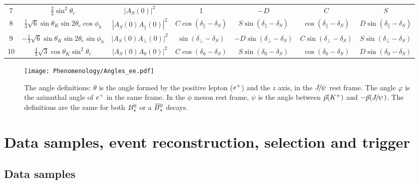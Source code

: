 \begin{sidewaystable}[h]
\begin{center}
\begin{tabular}{c|c|c|c|c|c|c}
    7   & $\frac{2}{3}\sin^{2}\theta_{e}$ & $|A_{S}(0)|^{2}$ &  1 & $-D$ & $C$ & $S$\\
    8   & $\frac{1}{3}\sqrt{6}\sin\theta_{K}\sin2\theta_{e}\cos\phi_{h}$ & $|A_{S}(0)A_{\parallel}(0)|^{2}$ & $C\cos(\delta_{\parallel}-\delta_{S})$  & $S\sin(\delta_{\parallel}-\delta_{S})$ & $\cos(\delta_{\parallel}-\delta_{S})$ & $D\sin(\delta_{\parallel}-\delta_{S})$\\
    9   & $-\frac{1}{3}\sqrt{6}\sin\theta_{K}\sin2\theta_{e}\sin\phi_{h}$ & $|A_{S}(0)A_{\perp}(0)|^{2}$ & $\sin(\delta_{\perp}-\delta_{S})$  & $-D\sin(\delta_{\perp}-\delta_{S})$ & $C\sin(\delta_{\perp}-\delta_{S})$ & $S\sin(\delta_{\perp}-\delta_{S})$\\
    10   & $\frac{4}{3}\sqrt{3}\cos\theta_{K}\sin^{2}\theta_{e}$ & $|A_{S}(0)A_{0}(0)|^{2}$ & $C\cos(\delta_{0}-\delta_{S})$  & $S\sin(\delta_{0}-\delta_{S})$ & $\cos(\delta_{0}-\delta_{S})$ & $D\sin(\delta_{0}-\delta_{S})$\\
    \hline
  \end{tabular}\end{center}
\label{tab:AngTimeFunction}
\end{sidewaystable}

   \begin{figure}[hbt]
  \begin{center}
    \texttt{[image: Phenomenology/Angles\_ee.pdf]}
  \end{center}
  \caption{
   The angle definitions: $\theta$ is the angle formed by the positive lepton (${e^+}$) and the $z$ axis, in the ${{J\mskip -3mu/\mskip -2mu\psi\mskip 2mu}}$ rest frame. The angle $\varphi$ is the azimuthal angle of ${e^+}$ in the same frame. In the $\phi$ meson rest frame, $\psi$ is the angle between $\vec{p}({{K}^+})$ and $-\vec{p}({{J\mskip -3mu/\mskip -2mu\psi\mskip 2mu}})$. The definitions are the same for both ${{B}^0_{s}}$ or a ${{\kern 0.18em\overline{\kern -0.18em B}{}}{}^0_{s}}$ decays.   
}
  \label{fig:Phen:Angles}
\end{figure}
\clearpage


\section{Data samples, event reconstruction, selection and trigger}\label{sec:Data}
\subsection{Data samples}

